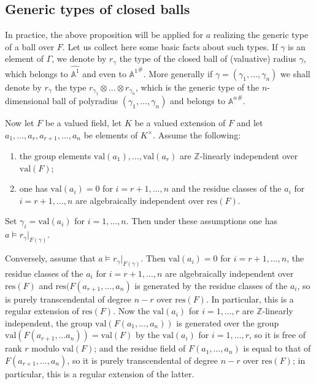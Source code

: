 \documentclass[JEP,XML,SOM,Unicode,ThmDefs,NoEqCountersInSection,published]{cedram}
\newcommand{\val}{\mathrm{val}}
\newcommand{\bA}{\mathbb A}
\newcommand{\Z}{\mathbb Z}
\theoremstyle{plain}
\theoremstyle{definition}
\newcommand\stda[1]{{#1}^{\#}}
\begin{document}
\subsection{Generic types of closed balls}\label{gentypeball}
In practice, the above proposition will be applied for $a$ realizing the generic type of a ball over $F$. Let us collect here some basic facts about such types.
If $\gamma$ is an element of $\Gamma$, we denote by $r_\gamma$ the type of the closed ball of (valuative) radius $\gamma$, which belongs to
$\widehat{\bA^1}$ and even to $\stda{\bA^{1}}$. More generally if $\gamma=(\gamma_1,\ldots, \gamma_n)$ we shall denote
by $r_\gamma$ the type $r_{\gamma_1}\otimes \ldots\otimes r_{\gamma_n}$, which is the generic type of the $n$\nobreakdash-dimen\-sional ball of
polyradius $(\gamma_1,\ldots, \gamma_n)$ and belongs to $\stda{\bA^{n}}$.

Now let $F$ be a valued field, let $K$ be a
valued extension of $F$ and let $a_1,\ldots, a_r, a_{r+1},\ldots, a_n$ be elements of $K^\times$.
Assume the following:
\begin{enumerate}
\item the group elements $\val(a_1), \ldots, \val(a_r)$ are $\Z$-linearly independent over $\val (F)$;
\item one has $\val(a_i)=0$ for $i=r+1,\ldots, n$ and the residue classes of the $a_i$ for $i=r+1,\ldots, n$ are algebraically independent
over $\mathrm{res}(F)$.
\end{enumerate}
Set $\gamma_i=\val(a_i)$ for $i=1,\ldots, n$. Then under these assumptions one has $a\models r_\gamma|_{F(\gamma)}$.

Conversely, assume that $a\models r_\gamma|_{F(\gamma)}$. Then $\val(a_i)=0$ for $i=r+1,\ldots, n$, the
residue classes of the $a_i$ for $i=r+1,\ldots, n$ are algebraically
independent over $\mathrm{res}(F)$ and
$\mathrm{res}(F(a_{r+1},\ldots, a_n)$ is generated by the residue classes of the $a_i$, so is purely transcendental of
degree $n-r$ over $\mathrm{res}(F)$.
In particular, this is a regular extension of $\mathrm{res}(F)$.
Now the $\val(a_i)$ for $i=1,\ldots, r$ are $\Z$-linearly independent, the group $\val(F(a_1,\ldots, a_n))$ is generated over
the group $\val(F(a_{r+1},\ldots a_n))=\val(F)$ by the $\val(a_i) $ for $i=1,\ldots, r$, so it is free of rank $r$ modulo $\val(F)$; and the residue field of $F(a_1,\ldots, a_n)$
is equal to that of $F(a_{r+1},\ldots, a_n)$, so it is purely transcendental of degree $n-r$ over $\mathrm{res}(F)$; in particular,
this is a regular extension of the latter.
\end{document}
